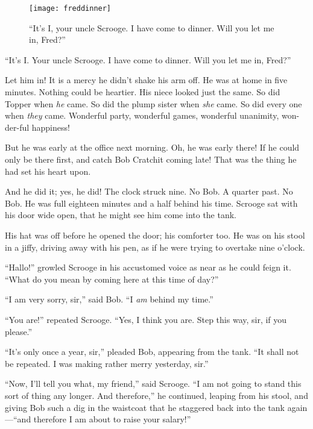 \documentclass[paper=a5,BCOR=15mm,twoside,DIV=15,headinclude=off,12pt,chapterprefix=off,openany,headings=huge]{scrbook} %
\begin{document}
\begin{figure}[p]
\begin{minipage}[c]{\linewidth}
\texttt{[image: freddinner]}
\caption*{\enquote{It's I, your uncle Scrooge. I have come to dinner. Will you let me in, Fred?}}
\end{minipage}
\end{figure}

\enquote{It's I. Your uncle Scrooge. I have come to dinner. Will you let me in, Fred?}

Let him in! It is a mercy he didn't shake his arm off. He was at home in five minutes. Nothing could be heartier. His niece looked just the same. So did Topper when \textit{he} came. So did the plump sister when \textit{she} came. So did every one when \textit{they} came. Wonderful party, wonderful games, wonderful unanimity, won-der-ful happiness!

But he was early at the office next morning. Oh, he was early there! If he could only be there first, and catch Bob Cratchit coming late! That was the thing he had set his heart upon.

And he did it; yes, he did! The clock struck nine. No Bob. A quarter past. No Bob. He was full eighteen minutes and a half behind his time. Scrooge sat with his door wide open, that he might see him come into the tank.

His hat was off before he opened the door; his comforter too. He was on his stool in a jiffy, driving away with his pen, as if he were trying to overtake nine o'clock.

\enquote{Hallo!} growled Scrooge in his accustomed voice as near as he could feign it. \enquote{What do you mean by coming here at this time of day?}

\enquote{I am very sorry, sir,} said Bob. \enquote{I \textit{am} behind my time.}

\enquote{You are!} repeated Scrooge. \enquote{Yes, I think you are. Step this way, sir, if you please.}

\enquote{It's only once a year, sir,} pleaded Bob, appearing from the tank. \enquote{It shall not be repeated. I was making rather merry yesterday, sir.}

\enquote{Now, I'll tell you what, my friend,} said Scrooge. \enquote{I am not going to stand this sort of thing any longer. And therefore,} he continued, leaping from his stool, and giving Bob such a dig in the waistcoat that he staggered back into the tank again—\enquote{and therefore I am about to raise your salary!}
\end{document}

